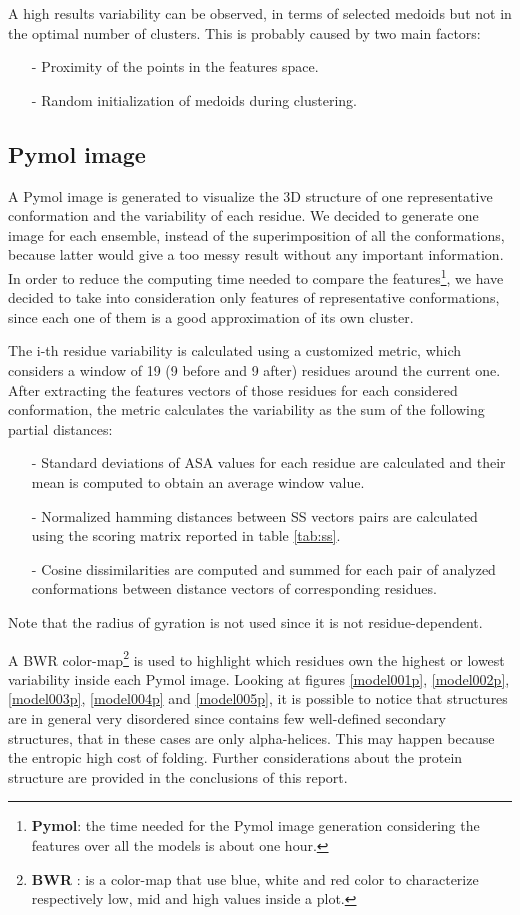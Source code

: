 A high results variability can be observed, in terms of selected medoids but not in the optimal number of clusters.
This is probably caused by two main factors:
\begin{itemize}
    \item[-] Proximity of the points in the features space.
    \item[-] Random initialization of medoids during clustering.
\end{itemize}

\subsection{Pymol image}
A Pymol image is generated to visualize the 3D structure of one representative conformation and the variability of each residue.
We decided to generate one image for each ensemble, instead of the superimposition of all the conformations, because latter would give a too messy result without any important information.
In order to reduce the computing time needed to compare the features\footnote{\textbf{Pymol}: the time needed for the Pymol image generation considering the features over all the models is about one hour.}, we have decided to take into consideration only features of representative conformations, since each one of them is a good approximation of its own cluster.

\medskip
The i-th residue variability is calculated using a customized metric, which considers a window of 19 (9 before and 9 after) residues around the current one. After extracting the features vectors of those residues for each considered conformation, the metric calculates the variability as the sum of the following partial distances:
\begin{itemize}
\item[-] Standard deviations of ASA values for each residue are calculated and their mean is computed to obtain an average window value.
\item[-] Normalized hamming distances between SS vectors pairs are calculated using the scoring matrix reported in table \ref{tab:ss}.
\item[-] Cosine dissimilarities are computed and summed for each pair of analyzed conformations between distance vectors of corresponding residues.
\end{itemize}
Note that the radius of gyration is not used since it is not residue-dependent.

\medskip
A BWR color-map\footnote{\textbf{BWR} : is a color-map that use blue, white and red color to characterize respectively low, mid and high values inside a plot.} is used to highlight which residues own the highest or lowest variability inside each Pymol image.
Looking at figures \ref{model001p}, \ref{model002p}, \ref{model003p}, \ref{model004p} and \ref{model005p}, it is possible to notice that structures are in general very disordered since contains few well-defined secondary structures, that in these cases are only alpha-helices. This may happen because the entropic high cost of folding. %
Further considerations about the protein structure are provided in the conclusions of this report.

